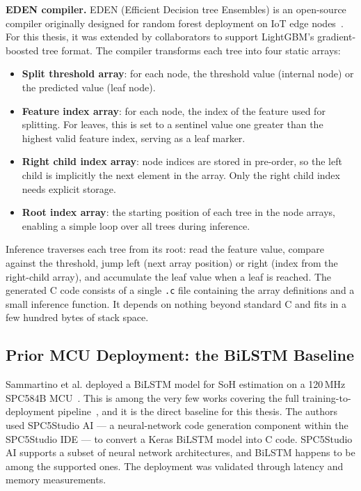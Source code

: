 \textbf{EDEN compiler.} EDEN (Efficient Decision tree Ensembles) is an open-source compiler originally designed for random forest deployment on IoT edge nodes~\autocite{Eden}. For this thesis, it was extended by collaborators to support LightGBM's gradient-boosted tree format. The compiler transforms each tree into four static arrays:

\begin{itemize}
    \item \textbf{Split threshold array}: for each node, the threshold value (internal node) or the predicted value (leaf node).
    \item \textbf{Feature index array}: for each node, the index of the feature used for splitting. For leaves, this is set to a sentinel value one greater than the highest valid feature index, serving as a leaf marker.
    \item \textbf{Right child index array}: node indices are stored in pre-order, so the left child is implicitly the next element in the array. Only the right child index needs explicit storage.
    \item \textbf{Root index array}: the starting position of each tree in the node arrays, enabling a simple loop over all trees during inference.
\end{itemize}

Inference traverses each tree from its root: read the feature value, compare against the threshold, jump left (next array position) or right (index from the right-child array), and accumulate the leaf value when a leaf is reached. The generated C code consists of a single \texttt{.c} file containing the array definitions and a small inference function. It depends on nothing beyond standard C and fits in a few hundred bytes of stack space.

\subsection{Prior MCU Deployment: the BiLSTM Baseline}

Sammartino et al. deployed a BiLSTM model for SoH estimation on a 120\,MHz SPC584B MCU~\autocite{Sammartino2021}. This is among the very few works covering the full training-to-deployment pipeline~\autocite{kumar2018fpga}, and it is the direct baseline for this thesis. The authors used SPC5Studio AI --- a neural-network code generation component within the SPC5Studio IDE --- to convert a Keras BiLSTM model into C code. SPC5Studio AI supports a subset of neural network architectures, and BiLSTM happens to be among the supported ones. The deployment was validated through latency and memory measurements.

